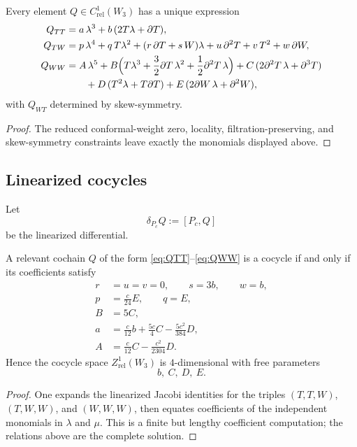 \begin{proposition}\label{prop:W3normalform}
Every element $Q\in C^1_{\mathrm{rel}}(W_3)$ has a unique expression
\begin{align}
Q_{TT}&=a\,\lambda^3+b\,(2T\lambda+\partial T),\label{eq:QTT}\\
Q_{TW}&=p\,\lambda^4+q\,T\lambda^2+(r\,\partial T+s\,W)\lambda+u\,\partial^2T+v\,T^2+w\,\partial W,\label{eq:QTW}\\
Q_{WW}&=
A\,\lambda^5
+B\Big(T\lambda^3+\frac32\partial T\,\lambda^2+\frac12\partial^2T\,\lambda\Big)
+C\,(2\partial^2T\,\lambda+\partial^3T)\notag\\
&\qquad
+D\,(T^2\lambda+T\partial T)
+E\,(2\partial W\,\lambda+\partial^2W),\label{eq:QWW}
\end{align}
with $Q_{WT}$ determined by skew-symmetry.
\end{proposition}

\begin{proof}
The reduced conformal-weight zero, locality, filtration-preserving, and skew-symmetry
constraints leave exactly the monomials displayed above.
\end{proof}

\subsection{Linearized cocycles}

Let
\[
\delta_{P_c}Q:=[P_c,Q]
\]
be the linearized differential.

\begin{proposition}\label{prop:W3cocycles}
A relevant cochain $Q$ of the form \eqref{eq:QTT}--\eqref{eq:QWW} is a cocycle if and only if
its coefficients satisfy
\begin{align}
r&=u=v=0,\qquad s=3b,\qquad w=b,\label{eq:rel1}\\
p&=\frac c{24}E,\qquad q=E,\label{eq:rel2}\\
B&=5C,\label{eq:rel3}\\
a&=\frac c{12}b+\frac{5c}{4}C-\frac{5c^2}{384}D,\label{eq:rel4}\\
A&=\frac c{12}C-\frac{c^2}{2304}D.\label{eq:rel5}
\end{align}
Hence the cocycle space $Z^1_{\mathrm{rel}}(W_3)$ is $4$-dimensional with free parameters
\[
b,\ C,\ D,\ E.
\]
\end{proposition}

\begin{proof}
One expands the linearized Jacobi identities for the triples $(T,T,W)$, $(T,W,W)$, and
$(W,W,W)$, then equates coefficients of the independent monomials in $\lambda$ and $\mu$.
This is a finite but lengthy coefficient computation; the relations above are the complete
solution.
\end{proof}

